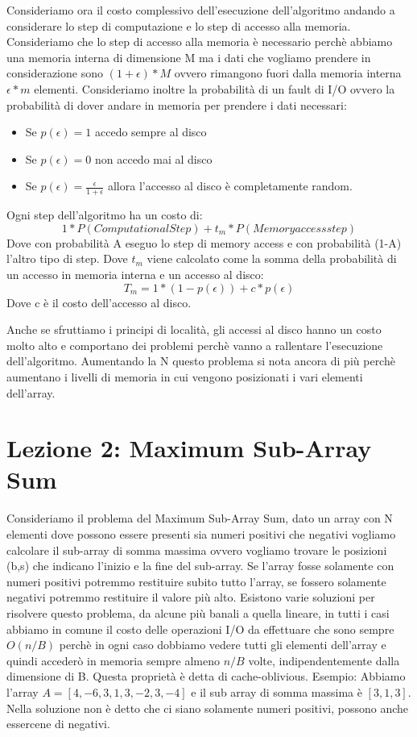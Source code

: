 \documentclass[14pt]{extreport}
\begin{document}
Consideriamo ora il costo complessivo dell'esecuzione dell'algoritmo andando a considerare lo step di computazione e lo step di accesso alla memoria.
Consideriamo che lo step di accesso alla memoria è necessario perchè abbiamo una memoria interna di dimensione M ma i dati che vogliamo prendere in considerazione sono $(1+\epsilon )*M$ ovvero rimangono fuori dalla memoria interna $\epsilon * m$ elementi.
Consideriamo inoltre la probabilità di un fault di I/O ovvero la probabilità di dover andare in memoria per prendere i dati necessari:
\begin{itemize}
\item Se $p(\epsilon) = 1$ accedo sempre al disco
\item Se $p(\epsilon) = 0$ non accedo mai al disco
\item Se $p(\epsilon) =\frac{\epsilon}{1+\epsilon}$ allora l'accesso al disco è completamente random. 
\end{itemize}
Ogni step dell'algoritmo ha un costo di:
\begin{equation}
1*P(Computational Step) + t_m * P(Memory access step)
\end{equation}
Dove con probabilità A eseguo lo step di memory access e con probabilità (1-A) l'altro tipo di step.
Dove $t_m$ viene calcolato come la somma della probabilità di un accesso in memoria interna e un accesso al disco:
\begin{equation}
T_m = 1*(1-p(\epsilon)) + c*p(\epsilon)
\end{equation}
Dove c è il costo dell'accesso al disco.

Anche se sfruttiamo i principi di località, gli accessi al disco hanno un costo molto alto e comportano dei problemi perchè vanno a rallentare l'esecuzione dell'algoritmo. Aumentando la N questo problema si nota ancora di più perchè aumentano i livelli di memoria in cui vengono posizionati i vari elementi dell'array.

\chapter{Lezione 2: Maximum Sub-Array Sum}

Consideriamo il problema del Maximum Sub-Array Sum, dato un array con N elementi dove possono essere presenti sia numeri positivi che negativi vogliamo calcolare il sub-array di somma massima ovvero vogliamo trovare le posizioni (b,s) che indicano l'inizio e la fine del sub-array.
Se l'array fosse solamente con numeri positivi potremmo restituire subito tutto l'array, se fossero solamente negativi potremmo restituire il valore più alto. 
Esistono varie soluzioni per risolvere questo problema, da alcune più banali a quella lineare, in tutti i casi abbiamo in comune il costo delle operazioni I/O da effettuare che sono sempre $O(n/B)$ perchè in ogni caso dobbiamo vedere tutti gli elementi dell'array e quindi accederò in memoria sempre almeno $n/B$ volte, indipendentemente dalla dimensione di B. Questa proprietà è detta di cache-oblivious.
Esempio: Abbiamo l'array $A = [4,-6,3,1,3,-2,3,-4]$ e il sub array di somma massima è $[3,1,3]$. Nella soluzione non è detto che ci siano solamente numeri positivi, possono anche essercene di negativi.
\end{document}
